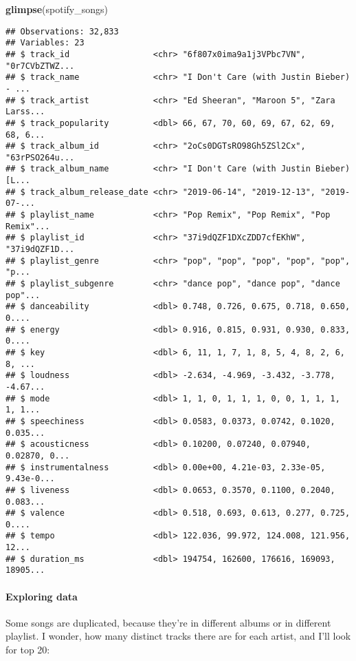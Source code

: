 \documentclass[]{article}
\newenvironment{Shaded}{\begin{snugshade}}{\end{snugshade}}
\newcommand{\KeywordTok}[1]{\textcolor[rgb]{0.13,0.29,0.53}{\textbf{#1}}}
\newcommand{\NormalTok}[1]{#1}
\let\oldparagraph\paragraph
\renewcommand{\paragraph}[1]{\oldparagraph{#1}\mbox{}}
\begin{document}
\begin{Shaded}
\begin{Highlighting}[]
\KeywordTok{glimpse}\NormalTok{(spotify_songs)}
\end{Highlighting}
\end{Shaded}

\begin{verbatim}
## Observations: 32,833
## Variables: 23
## $ track_id                 <chr> "6f807x0ima9a1j3VPbc7VN", "0r7CVbZTWZ...
## $ track_name               <chr> "I Don't Care (with Justin Bieber) - ...
## $ track_artist             <chr> "Ed Sheeran", "Maroon 5", "Zara Larss...
## $ track_popularity         <dbl> 66, 67, 70, 60, 69, 67, 62, 69, 68, 6...
## $ track_album_id           <chr> "2oCs0DGTsRO98Gh5ZSl2Cx", "63rPSO264u...
## $ track_album_name         <chr> "I Don't Care (with Justin Bieber) [L...
## $ track_album_release_date <chr> "2019-06-14", "2019-12-13", "2019-07-...
## $ playlist_name            <chr> "Pop Remix", "Pop Remix", "Pop Remix"...
## $ playlist_id              <chr> "37i9dQZF1DXcZDD7cfEKhW", "37i9dQZF1D...
## $ playlist_genre           <chr> "pop", "pop", "pop", "pop", "pop", "p...
## $ playlist_subgenre        <chr> "dance pop", "dance pop", "dance pop"...
## $ danceability             <dbl> 0.748, 0.726, 0.675, 0.718, 0.650, 0....
## $ energy                   <dbl> 0.916, 0.815, 0.931, 0.930, 0.833, 0....
## $ key                      <dbl> 6, 11, 1, 7, 1, 8, 5, 4, 8, 2, 6, 8, ...
## $ loudness                 <dbl> -2.634, -4.969, -3.432, -3.778, -4.67...
## $ mode                     <dbl> 1, 1, 0, 1, 1, 1, 0, 0, 1, 1, 1, 1, 1...
## $ speechiness              <dbl> 0.0583, 0.0373, 0.0742, 0.1020, 0.035...
## $ acousticness             <dbl> 0.10200, 0.07240, 0.07940, 0.02870, 0...
## $ instrumentalness         <dbl> 0.00e+00, 4.21e-03, 2.33e-05, 9.43e-0...
## $ liveness                 <dbl> 0.0653, 0.3570, 0.1100, 0.2040, 0.083...
## $ valence                  <dbl> 0.518, 0.693, 0.613, 0.277, 0.725, 0....
## $ tempo                    <dbl> 122.036, 99.972, 124.008, 121.956, 12...
## $ duration_ms              <dbl> 194754, 162600, 176616, 169093, 18905...
\end{verbatim}

\hypertarget{exploring-data}{%
\paragraph{Exploring data}\label{exploring-data}}

Some songs are duplicated, because they're in different albums or in
different playlist. I wonder, how many distinct tracks there are for
each artist, and I'll look for top 20:
\end{document}
